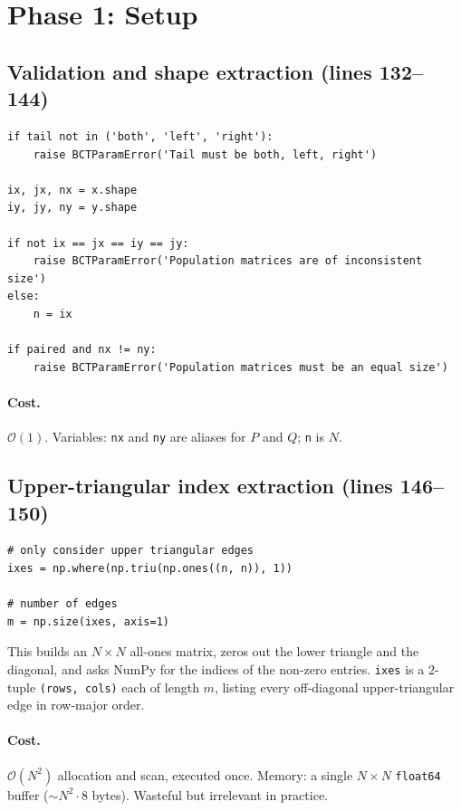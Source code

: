 \documentclass[11pt]{article}
\begin{document}
\section{Phase 1: Setup}

\subsection{Validation and shape extraction (lines 132--144)}

\begin{lstlisting}[firstnumber=132]
if tail not in ('both', 'left', 'right'):
    raise BCTParamError('Tail must be both, left, right')

ix, jx, nx = x.shape
iy, jy, ny = y.shape

if not ix == jx == iy == jy:
    raise BCTParamError('Population matrices are of inconsistent size')
else:
    n = ix

if paired and nx != ny:
    raise BCTParamError('Population matrices must be an equal size')
\end{lstlisting}

\paragraph{Cost.} $\mathcal{O}(1)$. Variables: \texttt{nx} and \texttt{ny} are aliases for $P$ and $Q$; \texttt{n} is $N$.

\subsection{Upper-triangular index extraction (lines 146--150)}

\begin{lstlisting}[firstnumber=146]
# only consider upper triangular edges
ixes = np.where(np.triu(np.ones((n, n)), 1))

# number of edges
m = np.size(ixes, axis=1)
\end{lstlisting}

This builds an $N\times N$ all-ones matrix, zeros out the lower triangle and the diagonal, and asks NumPy for the indices of the non-zero entries. \texttt{ixes} is a 2-tuple \texttt{(rows, cols)} each of length $m$, listing every off-diagonal upper-triangular edge in row-major order.

\paragraph{Cost.} $\mathcal{O}(N^2)$ allocation and scan, executed once. Memory: a single $N\times N$ \texttt{float64} buffer ($\sim N^2 \cdot 8$ bytes). Wasteful but irrelevant in practice.
\end{document}
